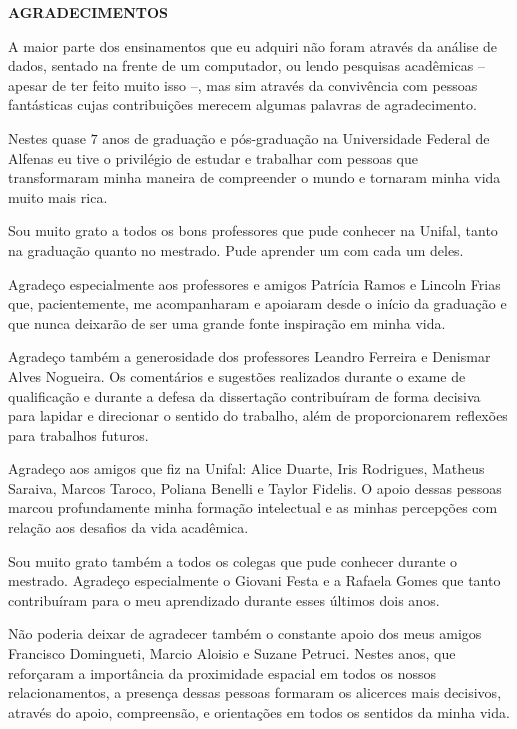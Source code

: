 \newpage
\begin{center}
\textbf{AGRADECIMENTOS}
\end{center}
\vspace{0.5cm}

A maior parte dos ensinamentos que eu adquiri não foram através da análise de dados, sentado na frente de um computador, ou lendo pesquisas acadêmicas -- apesar de ter feito muito isso --, mas sim através da convivência com pessoas fantásticas cujas contribuições merecem algumas palavras de agradecimento. 

Nestes quase $7$ anos de graduação e pós-graduação na Universidade Federal de Alfenas eu tive o privilégio de estudar e trabalhar com pessoas que transformaram minha maneira de compreender o mundo e tornaram minha vida muito mais rica. 

Sou muito grato a todos os bons professores que pude conhecer na Unifal, tanto na graduação quanto no mestrado. Pude aprender um com cada um deles. 

Agradeço especialmente aos professores e amigos Patrícia Ramos e Lincoln Frias que, pacientemente, me acompanharam e apoiaram desde o início da graduação e que nunca deixarão de ser uma grande fonte inspiração em minha vida.

Agradeço também a generosidade dos professores Leandro Ferreira e Denismar Alves Nogueira. Os comentários e sugestões realizados durante o exame de qualificação e durante a defesa da dissertação contribuíram de forma decisiva para lapidar e direcionar o sentido do trabalho, além de proporcionarem reflexões para trabalhos futuros. 

Agradeço aos amigos que fiz na Unifal: Alice Duarte, Iris Rodrigues, Matheus Saraiva, Marcos Taroco, Poliana Benelli e Taylor Fidelis. O apoio dessas pessoas marcou profundamente minha formação intelectual e as minhas percepções com relação aos desafios da vida acadêmica. 

Sou muito grato também a todos os colegas que pude conhecer durante o mestrado. Agradeço especialmente o Giovani Festa e a Rafaela Gomes que tanto contribuíram para o meu aprendizado durante esses últimos dois anos. 

Não poderia deixar de agradecer também o constante apoio dos meus amigos Francisco Domingueti, Marcio Aloisio e Suzane Petruci. Nestes anos, que reforçaram a importância da proximidade espacial em todos os nossos relacionamentos, a presença dessas pessoas formaram os alicerces mais decisivos, através do apoio, compreensão, e orientações em todos os sentidos da minha vida.

